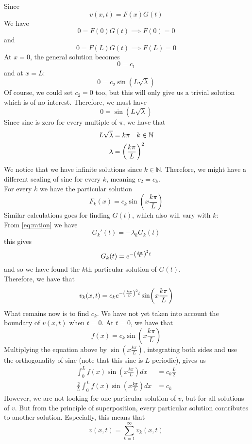 \documentclass[12pt,english,a4paper]{article}
\begin{document}
Since 
\[
v(x,t) = F(x)G(t)
\]
We have
\[
0 = F(0)G(t) \implies F(0) = 0
\]
and 
\[
0 = F(L)G(t) \implies F(L) = 0
\]
At \(x = 0\), the general solution becomes
\[
0 = c_1
\]
and at \(x = L\):
\[
0 =  c_2\sin(L\sqrt{\lambda})
\]
Of course, we could set \(c_2 = 0\) too, but this will only give us a trivial solution which is of no interest. Therefore, we must have 
\[
0 = \sin(L\sqrt{\lambda})
\]
Since sine is zero for every multiple of \(\pi\), we have that
\begin{align*}
L\sqrt{\lambda} &= k\pi \quad k\in \mathbb{N}\\
\lambda &= \qty(\frac{k \pi}{L})^2
\end{align*}
We notice that we have infinite solutions since \(k \in \mathbb{N}\). Therefore, we might have a different scaling of sine for every \(k\), meaning \(c_2 = c_k\).\\  For every \(k\) we have the particular solution 
\[
F_k(x) = c_k\sin(x\frac{k \pi}{L})
\]
Similar calculations goes for finding \(G(t)\), which also will vary with \(k\):\\
From \vref{eq:ration} we have
\[
G_k'(t) = -\lambda_k G_k(t)
\]
this gives
\[
G_k(t) = e^{-\qty(\frac{k \pi}{L})^2t}
\]
and so we have found the \(k\)th particular solution of \(G(t)\). \\
Therefore, we have that 
\[
v_k(x,t) = c_ke^{-\qty(\frac{k \pi}{L})^2t}\sin(x\frac{k \pi}{L})
\]
What remains now is to find \(c_k\). We have not yet taken into account the boundary of \(v(x,t)\) when \(t = 0\). At \(t = 0\), we have that
\[
f(x) = c_k\sin(x\frac{k \pi}{L})
\]
Multiplying  the equation above by \(\sin(x\frac{k \pi}{L})\), integrating both sides and use the orthogonality of sine (note that this sine is \(L\)-periodic), gives us
\begin{align*}
\int_0^Lf(x)\sin(x\frac{k \pi}{L})dx &= c_k\frac{L}{2} \\
\frac{2}{L}\int_0^Lf(x)\sin(x\frac{k \pi}{L})dx &= c_k
\end{align*}
However, we are not looking for one particular solution of \(v\), but for all solutions of \(v\). But from the principle of superposition, every particular solution contributes to another solution. Especially, this means that
\[
v(x,t) = \sum_{k=1}^\infty v_k(x,t)
\]
\end{document}
